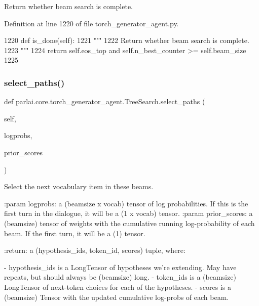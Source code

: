 \begin{DoxyVerb}Return whether beam search is complete.
\end{DoxyVerb}
 

Definition at line 1220 of file torch\+\_\+generator\+\_\+agent.\+py.


\begin{DoxyCode}
1220     \textcolor{keyword}{def }is\_done(self):
1221         \textcolor{stringliteral}{"""}
1222 \textcolor{stringliteral}{        Return whether beam search is complete.}
1223 \textcolor{stringliteral}{        """}
1224         \textcolor{keywordflow}{return} self.eos\_top \textcolor{keywordflow}{and} self.n\_best\_counter >= self.beam\_size
1225 
\end{DoxyCode}
\mbox{\label{classparlai_1_1core_1_1torch__generator__agent_1_1TreeSearch_a004609539d0428a9351a991168eb370b}} 
\subsubsection{\texorpdfstring{select\+\_\+paths()}{select\_paths()}}
{\footnotesize\ttfamily def parlai.\+core.\+torch\+\_\+generator\+\_\+agent.\+Tree\+Search.\+select\+\_\+paths (\begin{DoxyParamCaption}\item[{}]{self,  }\item[{}]{logprobs,  }\item[{}]{prior\+\_\+scores }\end{DoxyParamCaption})}

\begin{DoxyVerb}Select the next vocabulary item in these beams.

:param logprobs:
    a (beamsize x vocab) tensor of log probabilities. If this is the first
    turn in the dialogue, it will be a (1 x vocab) tensor.
:param prior_scores:
    a (beamsize) tensor of weights with the cumulative running
    log-probability of each beam. If the first turn, it will be a (1) tensor.

:return:
    a (hypothesis_ids, token_id, scores) tuple, where:

    - hypothesis_ids is a LongTensor of hypotheses we're extending. May have
      repeats, but should always be (beamsize) long.
    - token_ids is a (beamsize) LongTensor of next-token choices for
      each of the hypotheses.
    - scores is a (beamsize) Tensor with the updated cumulative log-probs
      of each beam.
\end{DoxyVerb}
 

